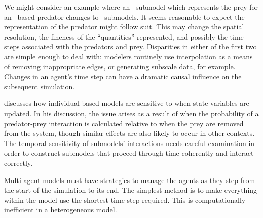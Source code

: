 We might consider an example where an \SD\ sub\-model which represents
the prey for an \SD\ based predator changes to \IB\ sub\-models. It
seems reasonable to expect the rep\-re\-sen\-ta\-tion of the predator might
follow suit. This may change the spatial resolution, the fineness of
the ``quantities'' represented, and possibly the time steps associated
with the predators and prey. Disparities in either of the first two
are simple enough to deal with: modelers routinely use interpolation
as a means of removing inappropriate edges, or generating subscale
data, for example.  Changes in an agent's time step can have a
dramatic causal influence on the subsequent simulation.

\cite{chivers2009generalised} discusses how in\-di\-vidu\-al-based models
are sen\-si\-tive to when state variables are updated.  In his discussion,
the issue arises as a result of when the probability of a
predator-prey in\-ter\-ac\-tion is cal\-cu\-la\-ted relative to when the prey are
re\-moved from the system, though sim\-i\-lar effects are also likely to
oc\-cur in other con\-texts. The temporal sen\-si\-tiv\-i\-ty of sub\-models'
interactions needs careful examination in order to construct sub\-models
that proceed through time coherently and interact correctly.

Multi-agent models must have strategies to manage the agents as they
step from the start of the simulation to its end.  The simplest method
is to make everything within the model use the shortest time step
required.  This is computationally inefficient in a heterogeneous
model.

